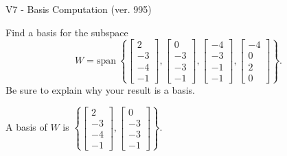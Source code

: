 \begin{exercise}
  \begin{exerciseTitle}V7 - Basis Computation (ver. 995)\end{exerciseTitle}
  \begin{exerciseStatement}
    Find a basis for the subspace 
\[W=\mathrm{span}\ \left\{\left[\begin{array}{r}
2 \\
-3 \\
-4 \\
-1
\end{array}\right] , \left[\begin{array}{r}
0 \\
-3 \\
-3 \\
-1
\end{array}\right] , \left[\begin{array}{r}
-4 \\
-3 \\
-1 \\
-1
\end{array}\right] , \left[\begin{array}{r}
-4 \\
0 \\
2 \\
0
\end{array}\right]\right\}.\]
 Be sure to explain why your result is a basis.


  \end{exerciseStatement}
  \begin{exerciseAnswer}
   A basis of \(W\) is  \(\left\{\left[\begin{array}{r}
2 \\
-3 \\
-4 \\
-1
\end{array}\right] , \left[\begin{array}{r}
0 \\
-3 \\
-3 \\
-1
\end{array}\right]\right\}\).
  


  \end{exerciseAnswer}
\end{exercise}